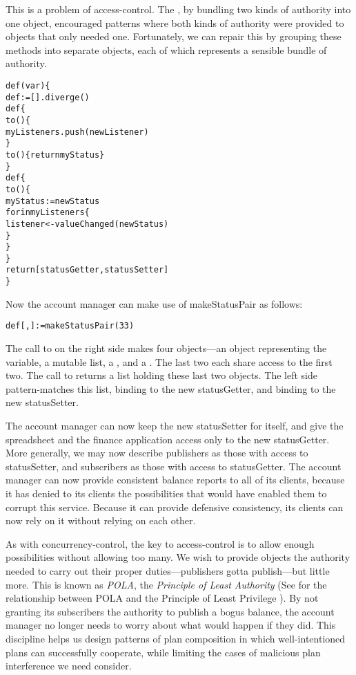\documentclass{llncs}
\begin{document}
This is a problem of access-control. The , by bundling two kinds
of authority into one object, encouraged patterns where both kinds of
authority were provided to objects that only needed one. Fortunately,
we can repair this by grouping these methods into separate objects,
each of which represents a sensible bundle of authority.
%
\begin{alltt}
    def (var ) \{
        def  := [].diverge()
        def  \{
            to () \{
                myListeners.push(newListener)
            \}
            to () \{ return myStatus \}
        \}
        def  \{
            to () \{
                myStatus := newStatus
                for  in myListeners \{
                    listener <- valueChanged(newStatus)
                \}
            \}
        \}
        return [statusGetter, statusSetter]
    \}
\end{alltt}
%
Now the account manager can make use of makeStatusPair as follows:
%
\begin{alltt}
    def [, ] := makeStatusPair(33)
\end{alltt}
%
The call to  on the right side makes four
objects---an object representing the  variable, a
mutable  list, a , and a
. The last two each share access to the first
two. The call to  returns a list holding these
last two objects. The left side pattern-matches this list,
binding  to the new statusGetter, and binding
 to the new statusSetter.

The account manager can now keep the new statusSetter for itself, and
give the spreadsheet and the finance application access only to the
new statusGetter. More generally, we may now describe publishers as
those with access to statusSetter, and subscribers as those with
access to statusGetter. The account manager can now provide consistent balance
reports to all of its clients, because it has denied to its clients
the possibilities that would have enabled them to corrupt this
service. Because it can provide defensive consistency, its clients can
now rely on it without relying on each other.

As with concurrency-control, the key to access-control is to allow
enough possibilities without allowing too many. We wish to provide
objects the authority needed to carry out their proper
duties---publishers gotta publish---but little more. This is known as
\emph{POLA}, the \emph{Principle of Least Authority} (See
\cite{miller:paradigm} for the relationship between POLA and the
Principle of Least Privilege \cite{SaltzerSc75}). By not granting its
subscribers the authority to publish a bogus balance, the account
manager no longer needs to worry about what would happen if they
did. This discipline helps us design patterns of plan composition
in which well-intentioned plans can successfully cooperate, while
limiting the cases of malicious plan interference we need consider.
\end{document}
